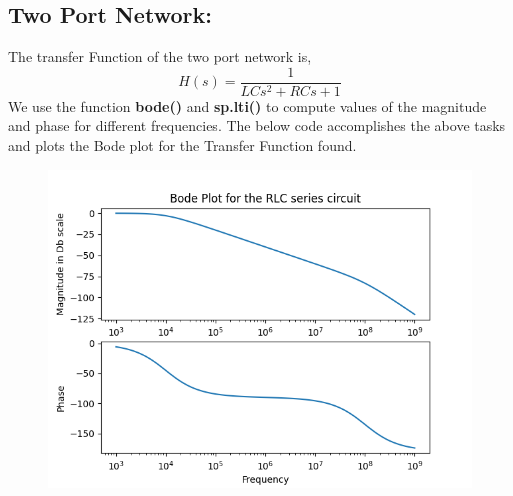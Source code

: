 \documentclass[12pt, a4paper]{report}
\begin{document}
\subsection{Two Port Network:}
The transfer Function of the two port network is,
\begin{equation}
H(s) = \frac{1}{LCs^2 + RCs + 1}
\end{equation}
We use the function \textbf{bode()} and \textbf{sp.lti()} to compute values of the magnitude and phase for different frequencies. The below code accomplishes the above tasks and plots the Bode plot for the Transfer Function found.
\vspace{100mm}
\noindent

\begin{figure}[h!]
    \centering
    \includegraphics[scale=0.75]{fig5.png} 
    \caption{}
    \label{fig:my_label}
\end{figure}
\end{document}
